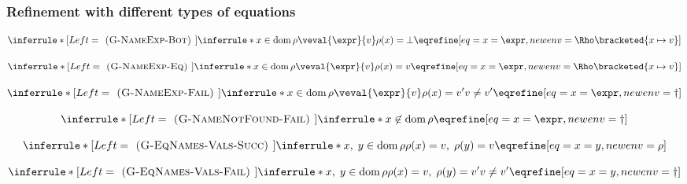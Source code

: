 \documentclass[]{article}
\DeclareMathOperator{\dom}{dom}
\begin{document}
\subsubsection{Refinement with different types of equations}

\[
\inferrule*[Left=\textsc{ (G-NameExp-Bot) }]
    {\inferrule* {}
    {
    x \in \dom \rho
    \\\\
    \veval{\expr}{v}
    \\\\
    \rho(x) = \bot
    }}
    {\eqrefine[eq={x = \expr},newenv=\Rho\bracketed{x \mapsto v}]}
\]

\[
\inferrule*[Left=\textsc{ (G-NameExp-Eq) }]
    {\inferrule* {}
    {
    x \in \dom \rho
    \\\\
    \veval{\expr}{v}
    \\\\
    \rho(x) = v
    }}
    {\eqrefine[eq={x = \expr},newenv=\Rho\bracketed{x \mapsto v}]}
\]

\[
\inferrule*[Left=\textsc{ (G-NameExp-Fail) }]
    {\inferrule* {}
    {
    x \in \dom \rho
    \\\\
    \veval{\expr}{v}
    \\\\ 
    \rho(x) = v'
    \\\\
    v \neq v'
    }}
    {\eqrefine[eq={x = \expr},newenv=\dagger]}
\]

\[
\inferrule*[Left=\textsc{ (G-NameNotFound-Fail) }]
    {\inferrule* {}
    {
    x \not\in \dom \rho
    }}
    {\eqrefine[eq={x = \expr},newenv=\dagger]}
\]

\[
\inferrule*[Left=\textsc{ (G-EqNames-Vals-Succ) }]
    {\inferrule* {}
    {
    x,\;y \in \dom \rho
    \\\\
    \rho(x) = v, \; \rho(y) = v
    }}
    {\eqrefine[eq={x = y},newenv=\rho]}
\]

\[
\inferrule*[Left=\textsc{ (G-EqNames-Vals-Fail) }]
    {\inferrule* {}
    {
    x,\;y \in \dom \rho
    \\\\
    \rho(x) = v, \; \rho(y) = v'
    \\\\
    v \neq v'}}
    {\eqrefine[eq={x = y},newenv=\dagger]}
\]

\end{document}
